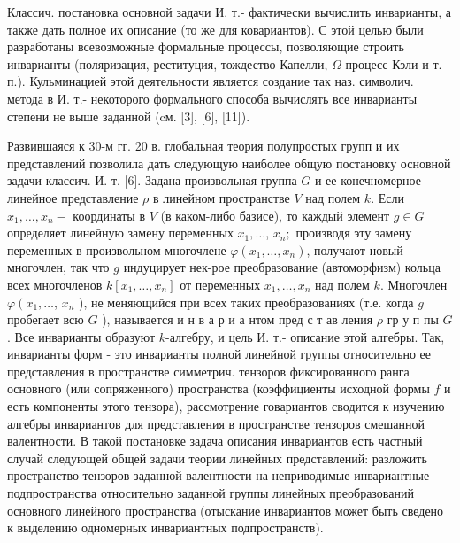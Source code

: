 \documentclass[10pt]{article}
\begin{document}
Классич. постановка основной задачи И. т.- фактически вычислить инварианты, а также дать полное их описание (то же для ковариантов). С этой целью были разработаны всевозможные формальные процессы, позволяющие строить инварианты (поляризация, реституция, тождество Капелли, $\Omega$-процесс Кэли и т. п.). Кульминацией этой деятельности является создание так наз. символич. метода в И. т.- некоторого формального способа вычислять все инварианты степени не выше заданной (cм. [3], [6], [11]).



Развившаяся к 30-м гг. 20 в. глобальная теория полупростых групп и их представлений позволила дать следующую наиболее общую постановку основной задачи классич. И. т. [6]. Задана произвольная группа $G$ и ее конечномерное линейное представление $\rho$ в линейном пространстве $V$ над полем $k$. Если $x_{1}, \ldots, x_{n}-$ координаты в $V$ (в каком-либо базисе), то каждый элемент $g \in G$ определяет линейную замену переменных $x_{1}, \ldots$, $x_{n} ;$ производя эту замену переменных в произвольном многочлене $\varphi\left(x_{1}, \ldots, x_{n}\right)$, получают новый многочлен, так что $g$ индуцирует нек-рое преобразование (автоморфизм) кольца всех многочленов $k\left[x_{1}, \ldots, x_{n}\right]$ от переменных $x_{1}, \ldots, x_{n}$ над полем $k$. Многочлен $\varphi\left(x_{1}, \ldots\right.$, $x_{n}$ ), не меняющийся при всех таких преобразованиях (т.е. когда $g$ пробегает всю $G$ ), называется и н в а р и а нтом пред с т ав ления $\rho$ гр у п пы $G$. Все инварианты образуют $k$-алгебру, и цель И. т.- описание этой алгебры. Так, инварианты форм - это инварианты полной линейной группы относительно ее представления в пространстве симметрич. тензоров фиксированного ранга основного (или сопряженного) пространства (коэффициенты исходной формы $f$ и есть компоненты этого тензора), рассмотрение говариантов сводится к изучению алгебры инвариантов для представления в пространстве тензоров смешанной валентности. В такой постановке задача описания инвариантов есть частный случай следующей общей задачи теории линейных представлений: разложить пространство тензоров заданной валентности на неприводимые инвариантные подпространства относительно заданной группы линейных преобразований основного линейного пространства (отыскание инвариантов может быть сведено к выделению одномерных инвариантных подпространств).
\end{document}
